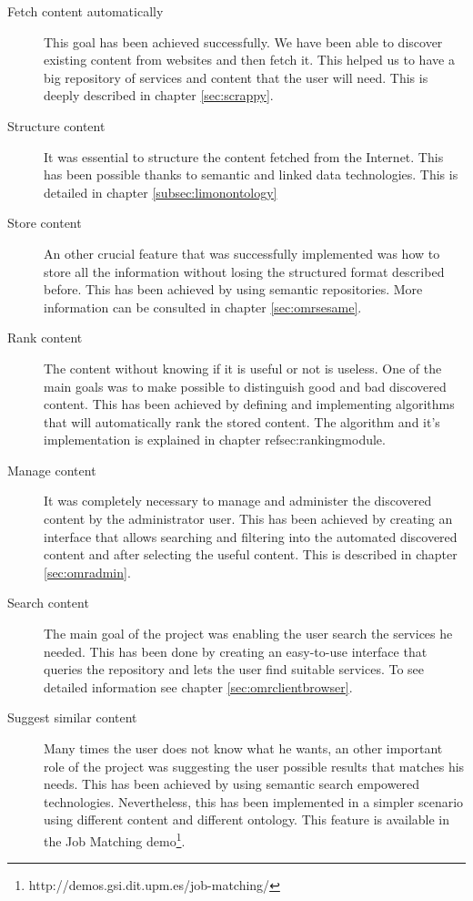 \begin{description}
\item[Fetch content automatically]
This goal has been achieved successfully. We have been able to discover existing content from websites and then fetch it. This helped us to have a big repository of services and content that the user will need. This is deeply described in chapter \ref{sec:scrappy}.

\item[Structure content] It was essential to structure the content fetched from the Internet. This has been possible thanks to semantic and linked data technologies. This is detailed in chapter \ref{subsec:limonontology}

\item[Store content] An other crucial feature that was successfully implemented was how to store all the information without losing the structured format described before. This has been achieved by using semantic repositories. More information can be consulted in chapter \ref{sec:omrsesame}.

\item[Rank content]The content without knowing if it is useful or not is useless. One of the main goals was to make possible to distinguish good and bad discovered content. This has been achieved by defining and implementing algorithms that will automatically rank the stored content. The algorithm and it's implementation is explained in chapter ref{sec:rankingmodule}.
 
\item[Manage content] It was completely necessary to manage and administer the discovered content by the administrator user. This has been achieved by creating an interface that allows searching and filtering into the automated discovered content and after selecting the useful content. This is described in chapter \ref{sec:omradmin}.

\item[Search content] The main goal of the project was enabling the user search the services he needed. This has been done by creating an easy-to-use interface that queries the repository and lets the user find suitable services. To see detailed information see chapter \ref{sec:omrclientbrowser}.

\item[Suggest similar content] Many times the user does not know what he wants, an other important role of the project was suggesting the user possible results that matches his needs. This has been achieved by using semantic search empowered technologies. Nevertheless, this has been implemented in a simpler scenario using different content and different ontology. This feature is available in the Job Matching demo\footnote{http://demos.gsi.dit.upm.es/job-matching/}.

\end{description}

